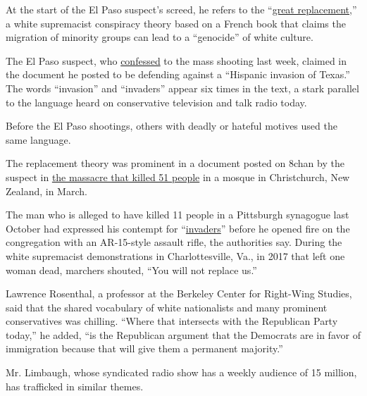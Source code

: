 At the start of the El Paso suspect's screed, he refers to the
``\href{https://www.nytimes3xbfgragh.onion/2019/08/06/us/politics/grand-replacement-explainer.html}{great
replacement},'' a white supremacist conspiracy theory based on a French
book that claims the migration of minority groups can lead to a
``genocide'' of white culture.

The El Paso suspect, who
\href{https://www.nytimes3xbfgragh.onion/2019/08/09/us/el-paso-suspect-confession.html}{confessed}
to the mass shooting last week, claimed in the document he posted to be
defending against a ``Hispanic invasion of Texas.'' The words
``invasion'' and ``invaders'' appear six times in the text, a stark
parallel to the language heard on conservative television and talk radio
today.

Before the El Paso shootings, others with deadly or hateful motives used
the same language.

The replacement theory was prominent in a document posted on 8chan by
the suspect in
\href{https://www.nytimes3xbfgragh.onion/2019/06/13/world/australia/christchurch-shootings-not-guilty-plea.html?rref=collection\%2Fspotlightcollection\%2Fchristchurch-attack-new-zealand\&action=click\&contentCollection=world\&region=stream\&module=stream_unit\&version=latest\&contentPlacement=8\&pgtype=collection}{the
massacre that killed 51 people} in a mosque in Christchurch, New
Zealand, in March.

The man who is alleged to have killed 11 people in a Pittsburgh
synagogue last October had expressed his contempt for
``\href{https://www.nytimes3xbfgragh.onion/2018/10/27/us/active-shooter-pittsburgh-synagogue-shooting.html}{invaders}''
before he opened fire on the congregation with an AR-15-style assault
rifle, the authorities say. During the white supremacist demonstrations
in Charlottesville, Va., in 2017 that left one woman dead, marchers
shouted, ``You will not replace us.''

Lawrence Rosenthal, a professor at the Berkeley Center for Right-Wing
Studies, said that the shared vocabulary of white nationalists and many
prominent conservatives was chilling. ``Where that intersects with the
Republican Party today,'' he added, ``is the Republican argument that
the Democrats are in favor of immigration because that will give them a
permanent majority.''

Mr. Limbaugh, whose syndicated radio show has a weekly audience of 15
million, has trafficked in similar themes.

